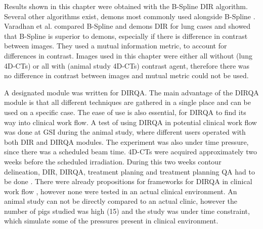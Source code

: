 \documentclass[type=dr, dr=rernat, accentcolor=tud7b,colorbacktitle, bigchapter, openright, twoside, 12pt ]{tudthesis}
\begin{document}
Results shown in this chapter were obtained with the B-Spline DIR algorithm. Several other algorithms exist, demons most commonly used alongside B-Spline \cite{Thirion1998}. Varadhan et al. compared B-Spline and demons DIR
for lung cases \cite{Varadhan2013} and showed that B-Spline is superior to demons, especially if there is difference in contrast between images. They used a mutual information
metric, to account for differences in contrast. Images used in this chapter were either all without (lung 4D-CTs) or all with (animal study 4D-CTs) contrast agent, therefore there was no difference in contrast
between images and mutual metric could not be used.

A designated module was written for DIRQA. The main advantage of the DIRQA module is that all different techniques are gathered in a single place and can be used on a specific case. 
The ease of use is also essential, for DIRQA to find its way into clinical work flow.
A test of using DIRQA in potential clinical work flow was done at GSI during the animal study, where different users operated with both DIR and DIRQA modules. The experiment was also under time pressure, since there was
a scheduled beam time. 4D-CTs were acquired approximately two weeks before the scheduled irradiation. During this two weeks contour delineation, DIR, DIRQA, treatment planing 
and treatment planning QA had to be done \cite{Lehmann2015}.
There were already propositions for frameworks for DIRQA in clinical work flow \cite{Varadhan2013}, however none were tested in an actual clinical environment. An animal study can not be directly compared to an actual clinic,
however the number of pigs studied was high (15) and the study was under time constraint, which simulate some of the pressures present in clinical environment.
\end{document}
